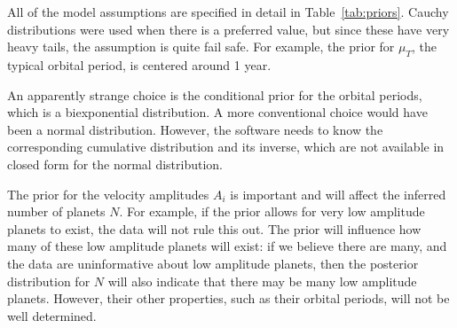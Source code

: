 \documentclass[useAMS,usenatbib]{mn2e}
\begin{document}
All of the model assumptions are specified in detail in
Table~\ref{tab:priors}. Cauchy distributions were used when there is a
preferred value, but since these have very heavy tails, the assumption is
quite fail safe. For example, the prior for $\mu_T$, the typical orbital period,
is centered around 1 year.

An apparently strange choice is the conditional prior for the orbital
periods, which is a biexponential distribution. A more conventional choice
would have been a normal distribution. However, the \citet{rjobject} software
needs to know the corresponding cumulative distribution and its inverse, which
are not available in closed form for the normal distribution.

The prior for the velocity amplitudes $A_i$ is important and will affect the
inferred number of planets $N$. For example, if the prior allows for very
low amplitude planets to exist, the data will not rule this out. The prior
will influence how many of these low amplitude planets will exist: if we
believe there are many, and the data are uninformative about low amplitude
planets, then the posterior distribution for $N$ will also indicate that there
may be many low amplitude planets. However, their other properties, such as
their orbital periods, will not be well determined.
\end{document}
